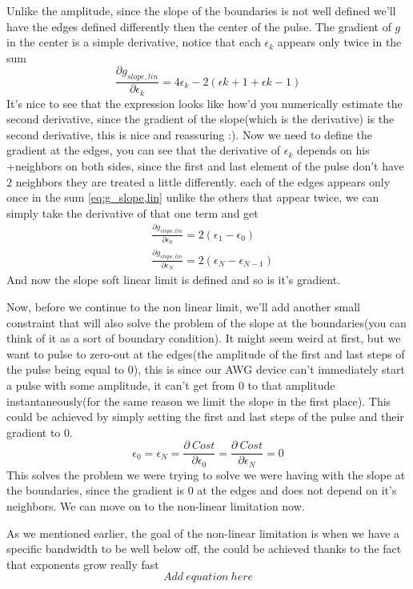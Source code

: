 \documentclass[english, a4paper, 12pt, twoside]{article}
\numberwithin{equation}{section} %
\begin{document}
Unlike the amplitude, since the slope of the boundaries is not well defined we'll have the edges defined differently then the center of the pulse. The gradient of \(g\) in the center is a simple derivative, notice that each \(\epsilon_k\) appears only twice in the sum
\[
    \frac{\partial g_{slope, lin}}{\partial \epsilon_k} = 4\epsilon_k - 2(\epsilon{k+1} + \epsilon{k-1})
\]
It's nice to see that the expression looks like how'd you numerically estimate the second derivative, since the gradient of the slope(which is the derivative) is the second derivative, this is nice and reassuring :). Now we need to define the gradient at the edges, you can see that the derivative of \(\epsilon_k\) depends on his 
+neighbors on both sides, since the first and last element of the pulse don't have 2 neighbors they are treated a little differently. each of the edges appears only once in the sum \ref{eq:g_slope,lin} unlike the others that appear twice, we can simply take the derivative of that one term and get
\begin{align*}
    &\frac{\partial g_{slope, lin}}{\partial \epsilon_0} = 2(\epsilon_1 - \epsilon_0) \\
    &\frac{\partial g_{slope, lin}}{\partial \epsilon_N} = 2(\epsilon_N - \epsilon_{N-1})
\end{align*} %
And now the slope soft linear limit is defined and so is it's gradient.

Now, before we continue to the non linear limit, we'll add another small constraint that will also solve the problem of the slope at the boundaries(you can think of it as a sort of boundary condition). It might seem weird at first, but we want to pulse to zero-out at the edges(the amplitude of the first and last steps of the pulse being equal to 0), this is since our AWG device can't immediately start a pulse with some amplitude, it can't get from 0 to that amplitude instantaneously(for the same reason we limit the slope in the first place). This could be achieved by simply setting the first and last steps of the pulse and their gradient to 0.
\[
    \epsilon_0 = \epsilon_N = \frac{\partial \ Cost}{\partial \epsilon_0} = \frac{\partial \ Cost}{\partial \epsilon_N} = 0
\]
This solves the problem we were trying to solve we were having with the slope at the boundaries, since the gradient is 0 at the edges and does not depend on it's neighbors. We can move on to the non-linear limitation now.

As we mentioned earlier, the goal of the non-linear limitation is when we have a specific bandwidth to be well below off, the could be achieved thanks to the fact that exponents grow really fast
\[
    Add\ equation\ here
\]
\end{document}

